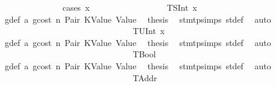 \begin{isabellebody}
\ \ \ \ \ \ \ \ \ \ \ \ \ \ \isamarkupfalse%
\ {\isacharparenleft}{\kern0pt}cases\ x{}{\isacharparenright}{\kern0pt}\isanewline
\ \ \ \ \ \ \ \ \ \ \ \ \ \ \ \ \isamarkupfalse%
\ {\isacharparenleft}{\kern0pt}TSInt\ x{}{\isacharparenright}{\kern0pt}\isanewline
\ \ \ \ \ \ \ \ \ \ \ \ \ \ \ \ \isamarkupfalse%
\ {}{\isacharparenleft}{\kern0pt}{}{\isacharparenright}{\kern0pt}\ g{\isacharunderscore}{\kern0pt}def\ a{}\ gcost\ n\ Pair\ KValue\ Value\ \isamarkupfalse%
\ {\isacharquery}{\kern0pt}thesis\ \isamarkupfalse%
\ stmt{\isachardot}{\kern0pt}psimps{\isacharparenleft}{\kern0pt}{}{\isacharparenright}{\kern0pt}\ st{\isacharprime}{\kern0pt}{\isacharunderscore}{\kern0pt}def\ \isamarkupfalse%
\ auto\isanewline
\ \ \ \ \ \ \ \ \ \ \ \ \ \ \isamarkupfalse%
\isanewline
\ \ \ \ \ \ \ \ \ \ \ \ \ \ \ \ \isamarkupfalse%
\ {\isacharparenleft}{\kern0pt}TUInt\ x{}{\isacharparenright}{\kern0pt}\isanewline
\ \ \ \ \ \ \ \ \ \ \ \ \ \ \ \ \isamarkupfalse%
\ {}{\isacharparenleft}{\kern0pt}{}{\isacharparenright}{\kern0pt}\ g{\isacharunderscore}{\kern0pt}def\ a{}\ gcost\ n\ Pair\ KValue\ Value\ \isamarkupfalse%
\ {\isacharquery}{\kern0pt}thesis\ \isamarkupfalse%
\ stmt{\isachardot}{\kern0pt}psimps{\isacharparenleft}{\kern0pt}{}{\isacharparenright}{\kern0pt}\ st{\isacharprime}{\kern0pt}{\isacharunderscore}{\kern0pt}def\ \isamarkupfalse%
\ auto\isanewline
\ \ \ \ \ \ \ \ \ \ \ \ \ \ \isamarkupfalse%
\isanewline
\ \ \ \ \ \ \ \ \ \ \ \ \ \ \ \ \isamarkupfalse%
\ TBool\isanewline
\ \ \ \ \ \ \ \ \ \ \ \ \ \ \ \ \isamarkupfalse%
\ {}{\isacharparenleft}{\kern0pt}{}{\isacharparenright}{\kern0pt}\ g{\isacharunderscore}{\kern0pt}def\ a{}\ gcost\ n\ Pair\ KValue\ Value\ \isamarkupfalse%
\ {\isacharquery}{\kern0pt}thesis\ \isamarkupfalse%
\ stmt{\isachardot}{\kern0pt}psimps{\isacharparenleft}{\kern0pt}{}{\isacharparenright}{\kern0pt}\ st{\isacharprime}{\kern0pt}{\isacharunderscore}{\kern0pt}def\ \isamarkupfalse%
\ auto\isanewline
\ \ \ \ \ \ \ \ \ \ \ \ \ \ \isamarkupfalse%
\isanewline
\ \ \ \ \ \ \ \ \ \ \ \ \ \ \ \ \isamarkupfalse%
\ TAddr\isanewline
\ \ \ \ \ \ \ \ \ \ \ \ \ \ \ \ \isamarkupfalse%

\end{isabellebody}

